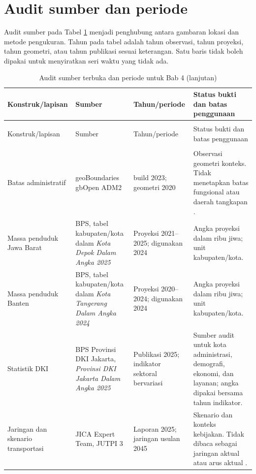 \documentclass[11pt,a4paper,oneside,openany,indonesian]{report}
\begin{document}
\section{Audit sumber dan periode}

Audit sumber pada Tabel \ref{tab:bab4-audit} menjadi penghubung antara gambaran lokasi dan metode pengukuran. Tahun pada tabel adalah tahun observasi, tahun proyeksi, tahun geometri, atau tahun publikasi sesuai keterangan. Satu baris tidak boleh dipakai untuk menyiratkan seri waktu yang tidak ada.

\begingroup
\footnotesize
\setlength{\tabcolsep}{4pt}
\begin{longtable}{>{\raggedright\arraybackslash}p{} >{\raggedright\arraybackslash}p{} >{\raggedright\arraybackslash}p{} >{\raggedright\arraybackslash}p{}}
\caption{Audit sumber terbuka dan periode untuk Bab 4}\label{tab:bab4-audit}\\
\toprule
Konstruk/lapisan & Sumber & Tahun/periode & Status bukti dan batas penggunaan \\
\midrule
\endfirsthead
\caption[]{Audit sumber terbuka dan periode untuk Bab 4 (lanjutan)}\\
\toprule
Konstruk/lapisan & Sumber & Tahun/periode & Status bukti dan batas penggunaan \\
\midrule
\endhead
\midrule
\multicolumn{4}{r}{\footnotesize Dilanjutkan pada halaman berikutnya}\\
\endfoot
\bottomrule
\endlastfoot
Batas administratif & geoBoundaries gbOpen ADM2 & build 2023; geometri 2020 & Observasi geometri konteks. Tidak menetapkan batas fungsional atau daerah tangkapan \parencite{geoboundaries2023}. \\
Massa penduduk Jawa Barat & BPS, tabel kabupaten/kota dalam \emph{Kota Depok Dalam Angka 2025} & Proyeksi 2021--2025; digunakan 2024 & Angka proyeksi dalam ribu jiwa; unit kabupaten/kota. \\
Massa penduduk Banten & BPS, tabel kabupaten/kota dalam \emph{Kota Tangerang Dalam Angka 2024} & Proyeksi 2020--2024; digunakan 2024 & Angka proyeksi dalam ribu jiwa; unit kabupaten/kota. \\
Statistik DKI & BPS Provinsi DKI Jakarta, \emph{Provinsi DKI Jakarta Dalam Angka 2025} & Publikasi 2025; indikator sektoral bervariasi & Sumber audit untuk kota administrasi, demografi, ekonomi, dan layanan; angka dipakai bersama tahun indikator. \\
Jaringan dan skenario transportasi & JICA Expert Team, JUTPI 3 & Laporan 2025; jaringan usulan 2045 & Skenario dan konteks kebijakan. Tidak dibaca sebagai jaringan aktual atau arus aktual \parencite{jica2025jutpi}. \\

\end{longtable}
\end{document}
